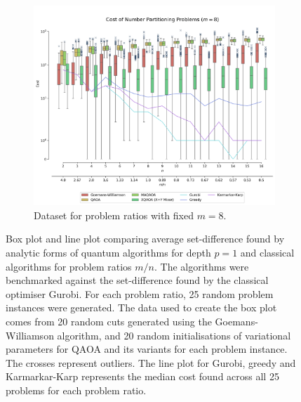 \begin{widetext}
\begin{minipage}{\linewidth}
\begin{figure}[H]
    \begin{subfigure}{\textwidth}
        \centering
        \includegraphics[scale=0.55]{"../figures/fixed_m.png"}
        \caption{Dataset for problem ratios with fixed $m=8$.}
        \label{fig:fixed_m}
    \end{subfigure}
    \caption{Box plot and line plot comparing average set-difference found by analytic forms of quantum algorithms for depth $p=1$ and classical algorithms for problem ratios $m/n$. The algorithms were benchmarked against the set-difference found by the classical optimiser Gurobi. For each problem ratio, 25 random problem instances were generated. The data used to create the box plot comes from 20 random cuts generated using the Goemans-Williamson algorithm, and 20 random initialisations of variational parameters for QAOA and its variants for each problem instance. The crosses represent outliers. The line plot for Gurobi, greedy and Karmarkar-Karp represents the median cost found across all 25 problems for each problem ratio.}
    
\end{figure}
\end{minipage}
\end{widetext}
%

